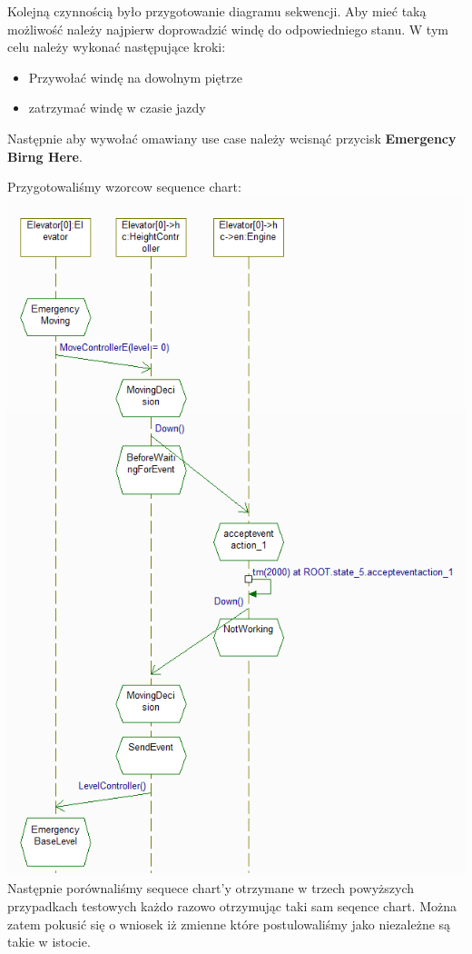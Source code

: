 \documentclass[a4paper,11pt]{article}
\begin{document}
Kolejną czynnością było przygotowanie diagramu sekwencji. 
Aby mieć taką możliwość należy najpierw doprowadzić windę do odpowiedniego stanu. 
W tym celu należy wykonać następujące kroki:
\begin{itemize}
	\item Przywołać windę na dowolnym piętrze
	\item zatrzymać windę w czasie jazdy
\end{itemize}

Następnie aby wywołać omawiany use case należy wcisnąć przycisk \textbf{Emergency Birng Here}.

Przygotowaliśmy wzorcow sequence chart: \\
\includegraphics{images/patternSequence.png} \\
Następnie porównaliśmy sequece chart'y otrzymane w trzech powyższych przypadkach testowych
każdo razowo otrzymując taki sam seqence chart. Można zatem pokusić się o wniosek iż zmienne które postulowaliśmy
jako niezależne są takie w istocie.
\end{document}
